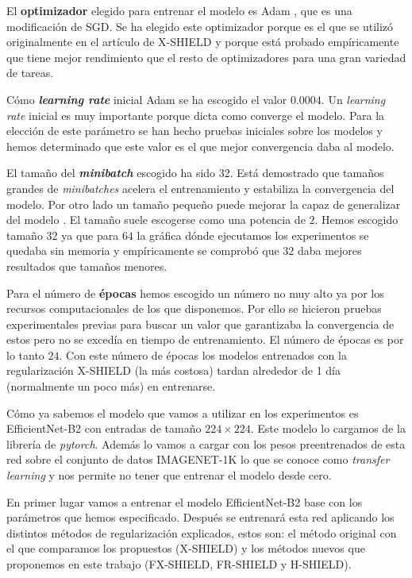 El \textbf{optimizador} elegido para entrenar el modelo es Adam \cite{adam}, que es una modificación de SGD. Se ha elegido este optimizador porque es el que se utilizó originalmente en el artículo de X-SHIELD \cite{XSHIELD} y porque está probado empíricamente que tiene mejor rendimiento que el resto de optimizadores para una gran variedad de tareas.

Cómo \textbf{\textit{learning rate}} inicial Adam se ha escogido el valor $0.0004$. Un \textit{learning rate} inicial es muy importante porque dicta como converge el modelo. Para la elección de este parámetro se han hecho pruebas iniciales sobre los modelos y hemos determinado que este valor es el que mejor convergencia daba al modelo.

El tamaño del \textbf{\textit{minibatch}} escogido ha sido 32. Está demostrado que tamaños grandes de \textit{minibatches} acelera el entrenamiento y estabiliza la convergencia del modelo. Por otro lado un tamaño pequeño puede mejorar la capaz de generalizar del modelo \cite{batchSize}. El tamaño suele escogerse como una potencia de $2$. Hemos escogido tamaño $32$ ya que para $64$ la gráfica dónde ejecutamos los experimentos se quedaba sin memoria y empíricamente se comprobó que $32$ daba mejores resultados que tamaños menores.

Para el número de \textbf{épocas} hemos escogido un número no muy alto ya por los recursos computacionales de los que disponemos. Por ello se hicieron pruebas experimentales previas para buscar un valor que garantizaba la convergencia de estos pero no se excedía en tiempo de entrenamiento. El número de épocas es por lo tanto $24$. Con este número de épocas los modelos entrenados con la regularización X-SHIELD (la más costosa) tardan alrededor de 1 día (normalmente un poco más) en entrenarse.

Cómo ya sabemos el modelo que vamos a utilizar en los experimentos es EfficientNet-B2 con entradas de tamaño $224 \times 224$. Este modelo lo cargamos de la librería de \textit{pytorch}. Además lo vamos a cargar con los pesos preentrenados de esta red sobre el conjunto de datos IMAGENET-1K lo que se conoce como \textit{transfer learning} y nos permite no tener que entrenar el modelo desde cero.

En primer lugar vamos a entrenar el modelo EfficientNet-B2 base con los parámetros que hemos especificado. Después se entrenará esta red aplicando los distintos métodos de regularización explicados, estos son: el método original con el que comparamos los propuestos (X-SHIELD) y los métodos nuevos que proponemos en este trabajo (FX-SHIELD, FR-SHIELD y H-SHIELD).

